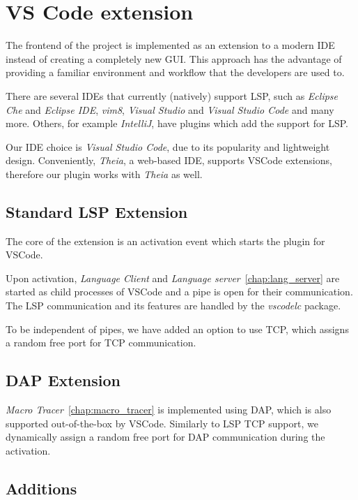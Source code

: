 \chapter{VS Code extension}

The frontend of the project is implemented as an extension to a modern IDE instead of creating a completely new GUI. This approach has the advantage of providing a familiar environment and workflow that the developers are used to.

There are several IDEs that currently (natively) support LSP, such as \emph{Eclipse Che} and \emph{Eclipse IDE}, \emph{vim8}, \emph{Visual Studio} and \emph{Visual Studio Code} and many more. Others, for example \emph{IntelliJ}, have plugins which add the support for LSP.

Our IDE choice is \emph{Visual Studio Code}, due to its popularity and lightweight design. Conveniently, \emph{Theia}, a web-based IDE, supports VSCode extensions, therefore our plugin works with \emph{Theia} as well.

\section{Standard LSP Extension}

The core of the extension is an activation event which starts the plugin for VSCode.

Upon activation, \emph{Language Client} and \emph{Language server}~\ref{chap:lang_server} are started as child processes of VSCode and a pipe is open for their communication. The LSP communication and its features are handled by the \emph{vscodelc} package. 

To be independent of pipes, we have added an option to use TCP, which assigns a random free port for TCP communication.

\section{DAP Extension}

\emph{Macro Tracer}~\ref{chap:macro_tracer} is implemented using DAP, which is also supported out-of-the-box by VSCode. Similarly to LSP TCP support, we dynamically assign a random free port for DAP communication during the activation.

\section{Additions}

